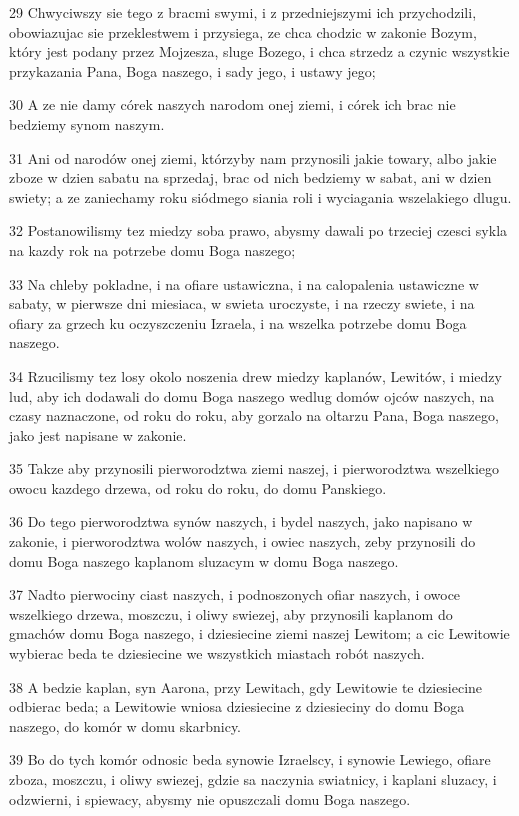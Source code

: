 \par 29 Chwyciwszy sie tego z bracmi swymi, i z przedniejszymi ich przychodzili, obowiazujac sie przeklestwem i przysiega, ze chca chodzic w zakonie Bozym, który jest podany przez Mojzesza, sluge Bozego, i chca strzedz a czynic wszystkie przykazania Pana, Boga naszego, i sady jego, i ustawy jego;
\par 30 A ze nie damy córek naszych narodom onej ziemi, i córek ich brac nie bedziemy synom naszym.
\par 31 Ani od narodów onej ziemi, którzyby nam przynosili jakie towary, albo jakie zboze w dzien sabatu na sprzedaj, brac od nich bedziemy w sabat, ani w dzien swiety; a ze zaniechamy roku siódmego siania roli i wyciagania wszelakiego dlugu.
\par 32 Postanowilismy tez miedzy soba prawo, abysmy dawali po trzeciej czesci sykla na kazdy rok na potrzebe domu Boga naszego;
\par 33 Na chleby pokladne, i na ofiare ustawiczna, i na calopalenia ustawiczne w sabaty, w pierwsze dni miesiaca, w swieta uroczyste, i na rzeczy swiete, i na ofiary za grzech ku oczyszczeniu Izraela, i na wszelka potrzebe domu Boga naszego.
\par 34 Rzucilismy tez losy okolo noszenia drew miedzy kaplanów, Lewitów, i miedzy lud, aby ich dodawali do domu Boga naszego wedlug domów ojców naszych, na czasy naznaczone, od roku do roku, aby gorzalo na oltarzu Pana, Boga naszego, jako jest napisane w zakonie.
\par 35 Takze aby przynosili pierworodztwa ziemi naszej, i pierworodztwa wszelkiego owocu kazdego drzewa, od roku do roku, do domu Panskiego.
\par 36 Do tego pierworodztwa synów naszych, i bydel naszych, jako napisano w zakonie, i pierworodztwa wolów naszych, i owiec naszych, zeby przynosili do domu Boga naszego kaplanom sluzacym w domu Boga naszego.
\par 37 Nadto pierwociny ciast naszych, i podnoszonych ofiar naszych, i owoce wszelkiego drzewa, moszczu, i oliwy swiezej, aby przynosili kaplanom do gmachów domu Boga naszego, i dziesiecine ziemi naszej Lewitom; a cic Lewitowie wybierac beda te dziesiecine we wszystkich miastach robót naszych.
\par 38 A bedzie kaplan, syn Aarona, przy Lewitach, gdy Lewitowie te dziesiecine odbierac beda; a Lewitowie wniosa dziesiecine z dziesieciny do domu Boga naszego, do komór w domu skarbnicy.
\par 39 Bo do tych komór odnosic beda synowie Izraelscy, i synowie Lewiego, ofiare zboza, moszczu, i oliwy swiezej, gdzie sa naczynia swiatnicy, i kaplani sluzacy, i odzwierni, i spiewacy, abysmy nie opuszczali domu Boga naszego.


